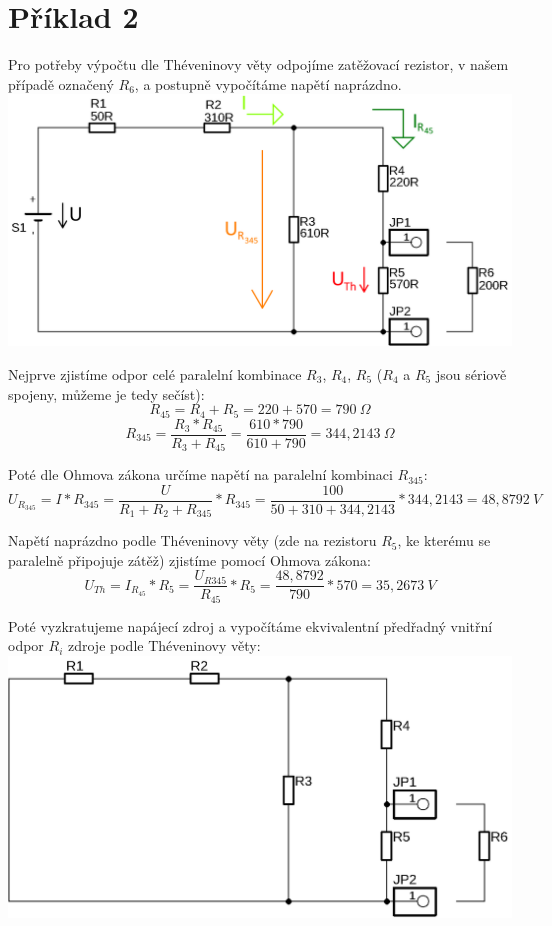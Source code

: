\section{Příklad 2}

Pro potřeby výpočtu dle Théveninovy věty odpojíme zatěžovací rezistor, v našem případě označený $R_6$, a postupně vypočítáme napětí naprázdno.\\

\includegraphics[totalheight=6cm]{fig/2_2.png}

Nejprve zjistíme odpor celé paralelní kombinace $R_3$, $R_4$, $R_5$ ($R_4$ a $R_5$ jsou sériově spojeny, můžeme je tedy sečíst):
{\large$$R_{45} = R_4 + R_5 = 220 + 570 = 790\:\Omega$$}
{\large$$R_{345} = \frac{R_3*R_{45}}{R_3 + R_{45}} = \frac{610*790}{610+790} = 344,2143\:\Omega$$}

Poté dle Ohmova zákona určíme napětí na paralelní kombinaci $R_{345}$:
{\large$$U_{R_{345}} = I * R_{345} = \frac{U}{R_1+R_2+R_{345}} * R_{345} = \frac{100}{50+310+344,2143} * 344,2143 = 48,8792\:V$$}

Napětí naprázdno podle Théveninovy věty (zde na rezistoru $R_5$, ke kterému se paralelně připojuje zátěž) zjistíme pomocí Ohmova zákona:
{\large$$U_{Th} = I_{R_{45}}*R_5 = \frac{U_{R345}}{R_{45}}*R_5 = \frac{48,8792}{790}*570 = 35,2673\:V$$}

\newpage
Poté vyzkratujeme napájecí zdroj a vypočítáme ekvivalentní předřadný vnitřní odpor $R_i$ zdroje podle Théveninovy věty: \\

\includegraphics[totalheight=6cm]{fig/2_3.png}

